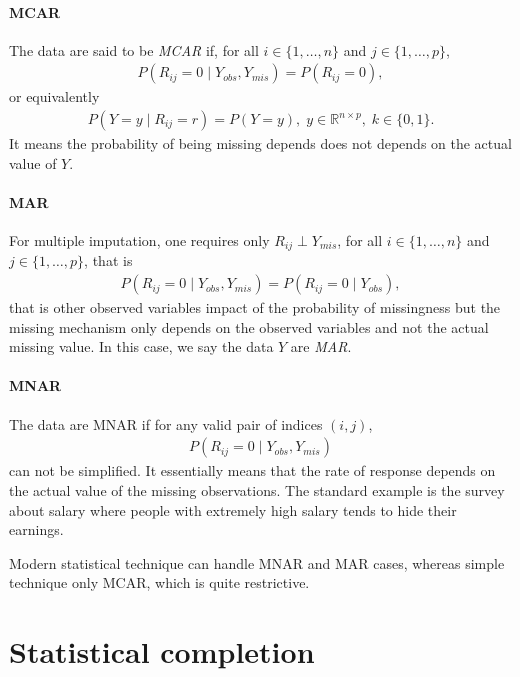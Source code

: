 \paragraph{MCAR}

The data are said to be \emph{MCAR} if, for all $i \in \{1, \dots, n\}$ and
$j \in \{1, \dots, p\}$,
\begin{align*}
P(R_{ij}=0 \; \vert \;  Y_{obs}, Y_{mis}) = P(R_{ij}=0),
\end{align*}
or equivalently
\begin{align*}
  P(Y = y \; \vert \;  R_{ij}=r) = P(Y=y), \; y \in \mathbb{R}^{n\times p}, \; k \in \{0, 1\}.
\end{align*}
It means the probability of being missing depends does not depends on the
actual value of $Y$.

\paragraph{MAR} For multiple imputation, one requires only $R_{ij} \perp Y_{mis}$,
for all $i \in \{1, \dots, n\}$ and $j \in \{1, \dots, p\}$, that is
\begin{align*}
  P(R_{ij}=0 \; \vert \;  Y_{obs}, Y_{mis}) = P(R_{ij}=0 \; \vert \;  Y_{obs}),
\end{align*}
that is other observed variables impact of the probability of missingness but
the missing mechanism only depends on the observed variables and not the actual
missing value. In this case, we say the data $Y$ are \emph{MAR}.

\paragraph{MNAR}
The data are MNAR if for any valid pair of indices $(i, j)$,
\begin{align*}
  P(R_{ij}=0 \; \vert \;  Y_{obs}, Y_{mis})
\end{align*}
can not be simplified. It essentially means that the rate of response depends
on the actual value of the missing observations. The standard example is the
survey about salary where people with extremely high salary tends to hide their
earnings.

Modern statistical technique can handle MNAR and MAR cases, whereas simple technique only
MCAR, which is quite restrictive.

\section{Statistical completion}
\label{sec:stand-appr-miss}


